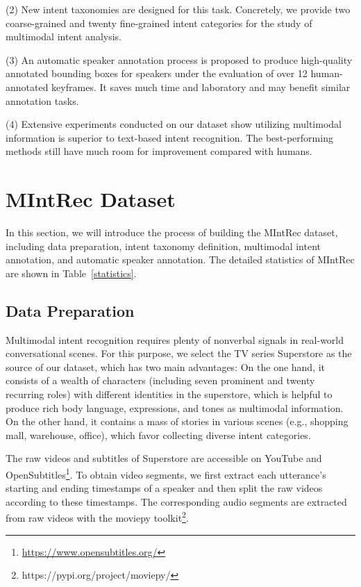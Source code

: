 \documentclass[sigconf,camera-ready]{acmart}
\begin{document}
(2) New intent taxonomies are designed for this task. Concretely, we provide two coarse-grained and twenty fine-grained intent categories for the study of multimodal intent analysis.

(3) An automatic speaker annotation process is proposed to produce high-quality annotated bounding boxes for speakers under the evaluation of over 12 human-annotated keyframes. It saves much time and laboratory and may benefit similar annotation tasks.

(4) Extensive experiments conducted on our dataset show utilizing multimodal information is superior to text-based intent recognition. The best-performing methods still have much room for improvement compared with humans. 

\section{MIntRec Dataset}
In this section, we will introduce the process of building the MIntRec dataset, including data preparation, intent taxonomy definition, multimodal intent annotation, and automatic speaker annotation. The detailed statistics of MIntRec are shown in Table~\ref{statistics}. 

\subsection{Data Preparation}
\label{data_collection}
Multimodal intent recognition requires plenty of nonverbal signals in real-world conversational scenes. For this purpose, we select the TV series Superstore as the source of our dataset, which has two main advantages: On the one hand, it consists of a wealth of characters (including seven prominent and twenty recurring roles) with different identities in the superstore, which is helpful to produce rich body language, expressions, and tones as multimodal information. On the other hand, it contains a mass of stories in various scenes (e.g., shopping mall, warehouse, office), which favor collecting diverse intent categories.

The raw videos and subtitles of Superstore are accessible on YouTube and OpenSubtitles\footnote{\url{https://www.opensubtitles.org/}}. To obtain video segments, we first extract each utterance's starting and ending timestamps of a speaker and then split the raw videos according to these timestamps. The corresponding audio segments are extracted from raw videos with the moviepy toolkit\footnote{https://pypi.org/project/moviepy/}. 
\end{document}
